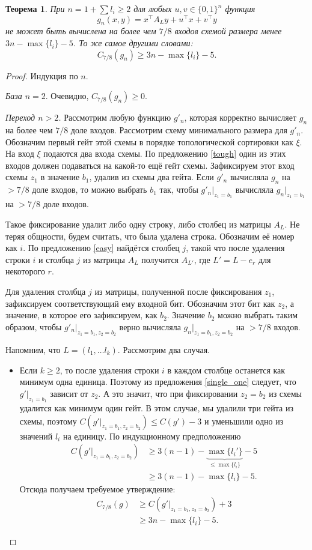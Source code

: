 \documentclass[oneside, a4paper]{article}
\newtheorem{theorem}{Теорема}
\theoremstyle{definition}
\theoremstyle{remark}
\begin{document}
\begin{theorem} \label{main}
При $n = 1 + \sum l_i \geq 2$ для любых $u, v \in \{0, 1\}^n$ функция
\[
g_n(x, y) = x^\top A_L y + u^\top x + v^\top y
\]
не может быть вычислена на более чем $7/8$ входов схемой размера менее $3n -
\max \{l_i\} - 5$. То же самое другими словами:
\[
C_{7/8}(g_n) \geq 3n - \max \{l_i\} - 5.
\]
\end{theorem}
\begin{proof}
Индукция по $n$.

\emph{База $n = 2$}. Очевидно, $C_{7/8}(g_n) \geq 0$.

\emph{Переход $n > 2$.} Рассмотрим любую функцию $g'_n$, которая корректно
вычисляет $g_n$ на более чем $7/8$ доле входов. Рассмотрим схему минимального
размера для $g'_n$. Обозначим первый гейт этой схемы в порядке топологической
сортировки как $\xi$. На вход $\xi$ подаются два входа схемы. По предложению \ref{tough}
один из этих входов должен подаваться на какой-то ещё гейт схемы. Зафиксируем
этот вход схемы $z_1$ в значение $b_1$, удалив из схемы два гейта. Если $g'_n$
вычисляла $g_n$ на $> 7/8$ доле входов, то можно выбрать $b_1$ так, чтобы
$g'_n \rvert_{z_1 = b_1}$ вычисляла $g_n \rvert_{z_1 = b_1}$ на $ > 7/8$ доле входов.

Такое фиксирование удалит либо одну строку, либо столбец из матрицы $A_L$. Не
теряя общности, будем считать, что была удалена строка. Обозначим её номер как
$i$. По предложению \ref{easy} найдётся столбец $j$, такой что после удаления
строки $i$ и столбца $j$ из матрицы $A_L$ получится $A_{L'}$, где $L' = L - e_r$
для некоторого $r$.

Для удаления столбца $j$ из матрицы, полученной после фиксирования $z_1$,
зафиксируем соответствующий ему входной бит. Обозначим этот бит как $z_2$, а
значение, в которое его зафиксируем, как $b_2$. Значение $b_2$ можно выбрать
таким образом, чтобы $g'_n \rvert _ {z_1 = b_1, z_2 = b_2}$ верно вычисляла
$g_n \rvert _ {z_1 = b_1, z_2 = b_2}$ на $> 7/8$ входов.

Напомним, что $L = (l_1, \dots l_k)$. Рассмотрим два случая.
\begin{itemize}
\item Если $k \geq 2$, то после удаления строки $i$ в каждом столбце останется
как минимум одна единица. Поэтому из предложения \ref{single_one} следует, что
$g' \rvert _ {z_1 = b_1}$ зависит от $z_2$. А это значит, что при фиксировании
$z_2 = b_2$ из схемы удалится как минимум один гейт. В этом случае, мы удалили
три гейта из схемы, поэтому $C(g' \rvert _ {z_1 = b_1, z_2 = b_2}) \leq C(g') - 3$
и уменьшили одно из значений $l_i$ на единицу. По индукционному предположению
\[
\begin{aligned}
C(g' \rvert _ {z_1 = b_1, z_2 = b_2}) &\geq 3(n - 1) - \underbrace{\max \{l_i'\}}_{\leq \max \{l_i\}} - 5 \\
&\geq 3(n - 1) - \max \{l_i\} - 5.
\end{aligned}
\]
Отсюда получаем требуемое утверждение:
\[
\begin{aligned}
C_{7/8}(g) &\geq C(g' \rvert _ {z_1 = b_1, z_2 = b_2}) + 3 \\
           &\geq 3n - \max \{l_i\} - 5.
\end{aligned}
\]


\end{itemize}
\end{proof}
\end{document}
